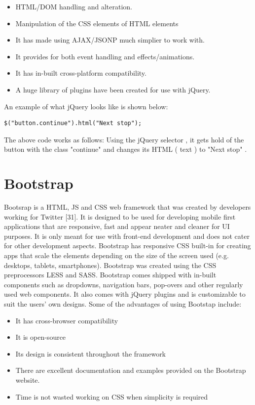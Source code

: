 \begin{itemize}
	\item HTML/DOM handling and alteration.
	\item Manipulation of the CSS elements of HTML elements
	\item It has made using AJAX/JSONP much simplier to work with.
	\item It provides for both event handling and effects/animations.
	\item It has in-built cross-platform compatibility.
	\item A huge library of plugins have been created for use with jQuery.
\end{itemize}
An example of what jQuery looks like is shown below:
\begin{verbatim}
$("button.continue").html("Next stop");
\end{verbatim}
The above code works as follows: Using the jQuery selector \textdollar, it gets hold of the button with the class "continue" and changes its HTML ( text ) to "Next stop" \cite{jquery}.
\section{Bootstrap}
Bootsrap is a HTML, JS and CSS web framework that was created by developers working for Twitter [31]. It is designed to be used for developing mobile first applications that are responsive, fast and appear neater and cleaner for UI purposes. It is only meant for use with front-end development and does not cater for other development aspects. Bootstrap has responsive CSS built-in for creating apps that scale the elements depending on the size of the screen used (e.g. desktops, tablets, smartphones). Bootstrap was created using the CSS preprocessors LESS and SASS.  Bootstrap comes shipped with in-built components such as dropdowns, navigation bars, pop-overs and other regularly used web components. It also comes with jQuery plugins and is customizable to suit the users’ own designs. Some of the advantages of using Bootstap include: 
\begin{itemize}
	\item It has cross-browser compatibility 
	\item It is open-source
	\item Its design is consistent throughout the framework
	\item There are excellent documentation and examples provided on the Bootstrap website.
	\item Time is not wasted working on CSS when simplicity is required \cite{bootstrap}
\end{itemize}
